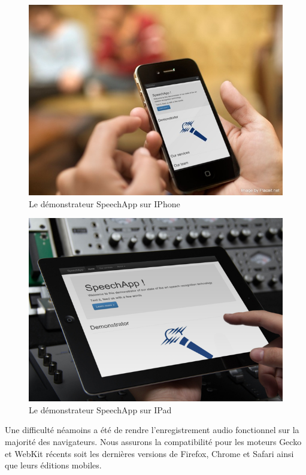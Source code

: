 \documentclass[a4paper,12pt]{report}
\begin{document}
\begin{figure}[H]
	\begin{center}
	\includegraphics[width=14cm]{pics/speechapp-iphone.png} 
	\end{center}
	\caption{Le démonstrateur SpeechApp sur IPhone}
\end{figure}

\begin{figure}[H]
	\begin{center}
	\includegraphics[width=14cm]{pics/speechapp-ipad.png} 
	\end{center}
	\caption{Le démonstrateur SpeechApp sur IPad}
\end{figure}

Une difficulté néamoins a été de rendre l'enregistrement audio fonctionnel sur la majorité des navigateurs. Nous assurons la compatibilité pour les moteurs Gecko et WebKit récents soit les dernières versions de Firefox, Chrome et Safari ainsi que leurs éditions mobiles.
\end{document}
